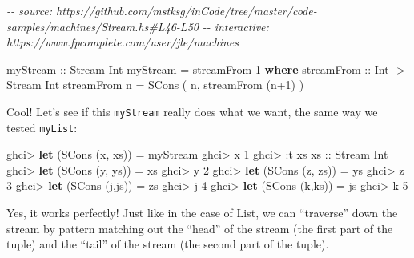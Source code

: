 \documentclass[]{article}
\newenvironment{Shaded}{}{}
\newcommand{\CommentTok}[1]{\textcolor[rgb]{0.38,0.63,0.69}{\textit{#1}}}
\newcommand{\DataTypeTok}[1]{\textcolor[rgb]{0.56,0.13,0.00}{#1}}
\newcommand{\DecValTok}[1]{\textcolor[rgb]{0.25,0.63,0.44}{#1}}
\newcommand{\KeywordTok}[1]{\textcolor[rgb]{0.00,0.44,0.13}{\textbf{#1}}}
\newcommand{\NormalTok}[1]{#1}
\newcommand{\OperatorTok}[1]{\textcolor[rgb]{0.40,0.40,0.40}{#1}}
\newcommand{\OtherTok}[1]{\textcolor[rgb]{0.00,0.44,0.13}{#1}}
\begin{document}
\begin{Shaded}
\begin{Highlighting}[]
\CommentTok{{-}{-} source: https://github.com/mstksg/inCode/tree/master/code{-}samples/machines/Stream.hs\#L46{-}L50}
\CommentTok{{-}{-} interactive: https://www.fpcomplete.com/user/jle/machines}

\OtherTok{myStream ::} \DataTypeTok{Stream} \DataTypeTok{Int}
\NormalTok{myStream }\OtherTok{=}\NormalTok{ streamFrom }\DecValTok{1}
  \KeywordTok{where}
\OtherTok{    streamFrom ::} \DataTypeTok{Int} \OtherTok{{-}\textgreater{}} \DataTypeTok{Stream} \DataTypeTok{Int}
\NormalTok{    streamFrom n }\OtherTok{=} \DataTypeTok{SCons}\NormalTok{ ( n, streamFrom (n}\OperatorTok{+}\DecValTok{1}\NormalTok{) )}
\end{Highlighting}
\end{Shaded}

Cool! Let's see if this \texttt{myStream} really does what we want, the same way
we tested \texttt{myList}:

\begin{Shaded}
\begin{Highlighting}[]
\NormalTok{ghci}\OperatorTok{\textgreater{}} \KeywordTok{let}\NormalTok{ (}\DataTypeTok{SCons}\NormalTok{ (x, xs)) }\OtherTok{=}\NormalTok{ myStream}
\NormalTok{ghci}\OperatorTok{\textgreater{}}\NormalTok{ x}
\DecValTok{1}
\NormalTok{ghci}\OperatorTok{\textgreater{}} \OperatorTok{:}\NormalTok{t xs}
\OtherTok{xs ::} \DataTypeTok{Stream} \DataTypeTok{Int}
\NormalTok{ghci}\OperatorTok{\textgreater{}} \KeywordTok{let}\NormalTok{ (}\DataTypeTok{SCons}\NormalTok{ (y, ys)) }\OtherTok{=}\NormalTok{ xs}
\NormalTok{ghci}\OperatorTok{\textgreater{}}\NormalTok{ y}
\DecValTok{2}
\NormalTok{ghci}\OperatorTok{\textgreater{}} \KeywordTok{let}\NormalTok{ (}\DataTypeTok{SCons}\NormalTok{ (z, zs)) }\OtherTok{=}\NormalTok{ ys}
\NormalTok{ghci}\OperatorTok{\textgreater{}}\NormalTok{ z}
\DecValTok{3}
\NormalTok{ghci}\OperatorTok{\textgreater{}} \KeywordTok{let}\NormalTok{ (}\DataTypeTok{SCons}\NormalTok{ (j,js)) }\OtherTok{=}\NormalTok{ zs}
\NormalTok{ghci}\OperatorTok{\textgreater{}}\NormalTok{ j}
\DecValTok{4}
\NormalTok{ghci}\OperatorTok{\textgreater{}} \KeywordTok{let}\NormalTok{ (}\DataTypeTok{SCons}\NormalTok{ (k,ks)) }\OtherTok{=}\NormalTok{ js}
\NormalTok{ghci}\OperatorTok{\textgreater{}}\NormalTok{ k}
\DecValTok{5}
\end{Highlighting}
\end{Shaded}

Yes, it works perfectly! Just like in the case of List, we can ``traverse'' down
the stream by pattern matching out the ``head'' of the stream (the first part of
the tuple) and the ``tail'' of the stream (the second part of the tuple).
\end{document}
